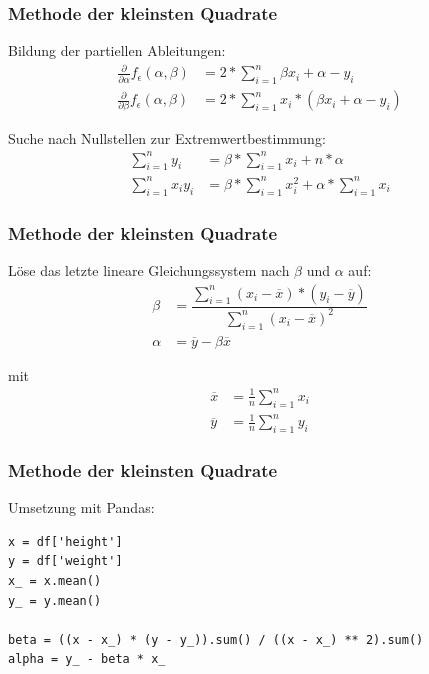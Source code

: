 
\begin{frame}
\frametitle{Methode der kleinsten Quadrate}

Bildung der partiellen Ableitungen:
\begin{align}
	\frac{\partial}{\partial \alpha} f_{\epsilon}(\alpha, \beta) &= 2 * \sum_{i=1}^{n} \beta x_i + \alpha - y_i \\
	\frac{\partial}{\partial \beta} f_{\epsilon}(\alpha, \beta) &= 2 * \sum_{i=1}^{n} x_i * (\beta x_i + \alpha - y_i)
\end{align}

\setcounter{equation}{0}

Suche nach Nullstellen zur Extremwertbestimmung:
\begin{align}
	\sum_{i=1}^{n} y_i &= \beta * \sum_{i=1}^{n} x_i + n * \alpha \\
	\sum_{i=1}^{n} x_i y_i &= \beta * \sum_{i=1}^{n} x_i^2 + \alpha * \sum_{i=1}^{n} x_i
\end{align}

\end{frame}


\begin{frame}
\frametitle{Methode der kleinsten Quadrate}

Löse das letzte lineare Gleichungssystem nach $\beta$ und $\alpha$ auf:
\begin{align*}
	\beta &= \dfrac{\sum_{i=1}^{n} (x_i - \overline{x}) * (y_i - \overline{y})}{\sum_{i=1}^{n} (x_i - \overline{x})^2} \\
	\alpha &= \overline{y} - \beta \overline{x}
\end{align*}

mit
\begin{align*}
	\overline{x} &= \tfrac{1}{n} \sum_{i=1}^{n} x_i \\
	\overline{y} &= \tfrac{1}{n} \sum_{i=1}^{n} y_i
\end{align*}

\end{frame}


\begin{frame}[fragile]
\frametitle{Methode der kleinsten Quadrate}

Umsetzung mit Pandas:
\begin{verbatim}
x = df['height']
y = df['weight']
x_ = x.mean()
y_ = y.mean()

beta = ((x - x_) * (y - y_)).sum() / ((x - x_) ** 2).sum()
alpha = y_ - beta * x_
\end{verbatim}

\end{frame}

